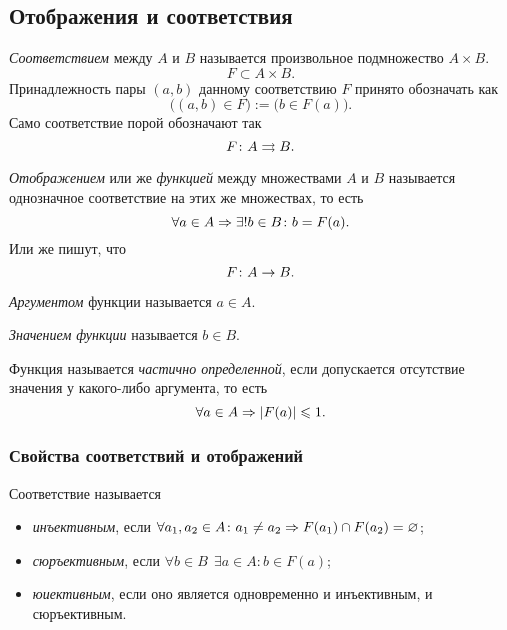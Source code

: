 \subsection{Отображения и соответствия}

\begin{definition}
	\textit{Соответствием} между $A$ и $B$ называется произвольное подмножество $A \times B$.
	$$
		F \subset A \times B.
	$$
	Принадлежность пары $(a, b)$ данному соответствию $F$ принято обозначать как
	$$
		\big((a, b) \in F\big) := \big(b \in F(a)\big).
	$$
	Само соответствие порой обозначают так
	$$
		F \colon A \rightrightarrows B.
	$$
\end{definition}

\begin{definition}
	\textit{Отображением} или же \textit{функцией} между множествами $A$ и $B$ называется однозначное соответствие на этих же множествах, то есть
	$$
		\forall a \in A \Rightarrow \exists! b \in B \colon b = F(a).
	$$
	Или же пишут, что
	$$
		F \colon A \rightarrow B.
	$$
\end{definition}

\begin{definition}
	\textit{Аргументом} функции называется $a \in A$.
\end{definition}

\begin{definition}
	\textit{Значением функции} называется $b \in B$.
\end{definition}

\begin{definition}
	Функция называется \textit{частично определенной}, если допускается отсутствие значения у какого-либо аргумента, то есть
	$$
		\forall a \in A \Rightarrow |F(a)| \leqslant 1.
	$$
\end{definition}

\subsubsection*{Свойства соответствий и отображений}

Соответствие называется
\begin{itemize}
	\item \textit{инъективным}, если $\forall a_1, a_2 \in A \colon a_1 \neq a_2 \Rightarrow F(a_1) \cap F(a_2) = \varnothing$;
	\item \textit{сюръективным}, если $\forall b \in B\ \ \exists a \in A\colon b \in F(a)$;
	\item \textit{юиективным}, если оно является одновременно и инъективным, и сюръективным.
\end{itemize}

